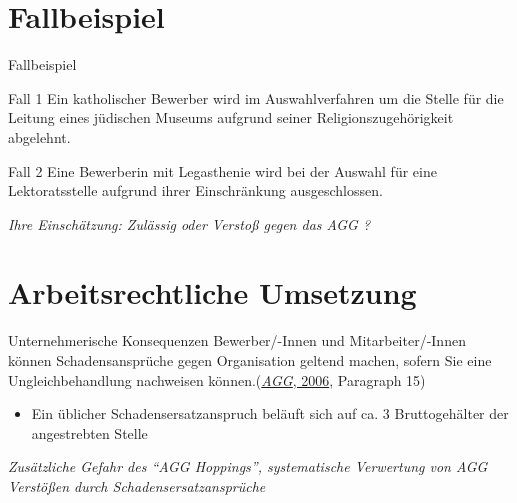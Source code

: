 \documentclass[
  10pt,
  ngerman,
  ignorenonframetext,
]{beamer}
\providecommand{\tightlist}{%
  \setlength{\itemsep}{0pt}\setlength{\parskip}{0pt}}
\begin{document}
\hypertarget{fallbeispiel}{%
\section{Fallbeispiel}\label{fallbeispiel}}

\begin{frame}{Fallbeispiel}
\begin{block}{Fall 1}
\protect\hypertarget{fall-1}{}
Ein katholischer Bewerber wird im Auswahlverfahren um die Stelle für die
Leitung eines jüdischen Museums aufgrund seiner Religionszugehörigkeit
abgelehnt.
\end{block}

\begin{block}{Fall 2}
\protect\hypertarget{fall-2}{}
Eine Bewerberin mit Legasthenie wird bei der Auswahl für eine
Lektoratsstelle aufgrund ihrer Einschränkung ausgeschlossen.~

\emph{Ihre Einschätzung: Zulässig oder Verstoß gegen das AGG ?}
\end{block}
\end{frame}

\hypertarget{arbeitsrechtliche-umsetzung}{%
\section{Arbeitsrechtliche
Umsetzung}\label{arbeitsrechtliche-umsetzung}}

\begin{frame}{Unternehmerische Konsequenzen}
\protect\hypertarget{unternehmerische-konsequenzen}{}
Bewerber/-Innen und Mitarbeiter/-Innen können Schadensansprüche gegen
Organisation geltend machen, sofern Sie eine Ungleichbehandlung
nachweisen können.(\protect\hyperlink{ref-agg}{\emph{AGG}, 2006},
Paragraph 15)

\begin{itemize}
\tightlist
\item
  Ein üblicher Schadensersatzanspruch beläuft sich auf ca. 3
  Bruttogehälter der angestrebten Stelle
\end{itemize}

\emph{Zusätzliche Gefahr des ``AGG Hoppings'', systematische Verwertung
von AGG Verstößen durch Schadensersatzansprüche}
\end{frame}
\end{document}
